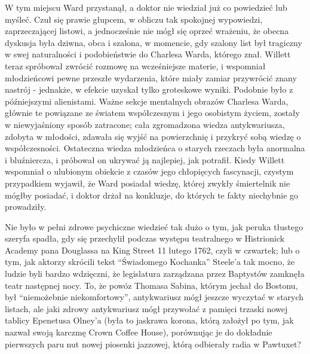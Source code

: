 W tym miejscu Ward przystanął, a doktor nie wiedział już co powiedzieć lub myśleć. Czuł się prawie głupcem, w obliczu tak spokojnej wypowiedzi, zaprzeczającej listowi, a jednocześnie nie mógł się oprzeć wrażeniu, że obecna dyskusja była dziwna, obca i szalona, w momencie, gdy szalony list był tragiczny w swej naturalności i podobieństwie do Charlesa Warda, którego znał. Willett teraz spróbował zwrócić rozmowę na wcześniejsze materie, i wspomniał młodzieńcowi pewne przeszłe wydarzenia, które miały zamiar przywrócić znany nastrój - jednakże, w efekcie uzyskał tylko groteskowe wyniki. Podobnie było z późniejszymi alienistami. Ważne sekcje mentalnych obrazów Charlesa Warda, głównie te powiązane ze światem współczesnym i jego osobistym życiem, zostały w niewyjaśniony sposób zatracone; cała zgromadzona wiedza antykwariusza, zdobyta w młodości, zdawała się wyjść na powierzchnię i przykryć sobą wiedzę o współczesności. Ostateczna wiedza młodzieńca o starych rzeczach była anormalna i bluźniercza, i próbował on ukrywać ją najlepiej, jak potrafił. Kiedy Willett wspomniał o ulubionym obiekcie z czasów jego chłopięcych fascynacji, czystym przypadkiem wyjawił, że Ward posiadał wiedzę, której zwykły śmiertelnik nie mógłby posiadać, i doktor drżał na konkluzje, do których te fakty niechybnie go prowadziły.  

Nie było w pełni zdrowe psychiczne wiedzieć tak dużo o tym, jak peruka tłustego szeryfa spadła, gdy się przechylił podczas występu teatralnego w Histrionick Academy pana Douglassa na King Street 11 lutego 1762, czyli w czwartek; lub o tym, jak aktorzy skrócili tekst ``Świadomego Kochanka'' Steele'a tak mocno, że ludzie byli bardzo wdzięczni, że legislatura zarządzana przez Baptystów zamknęła teatr następnej nocy. To, że powóz Thomasa Sabina, którym jechał do Bostonu, był ``niemożebnie niekomfortowy'', antykwariusz mógł jeszcze wyczytać w starych listach, ale jaki zdrowy antykwariusz mógł przywołać z pamięci trzaski nowej tablicy Epenetusa Olney'a (była to jaskrawa korona, którą założył po tym, jak nazwał swoją karczmę Crown Coffee House), porównując je do dokładnie pierwszych paru nut nowej piosenki jazzowej, którą odbierały radia w Pawtuxet?

